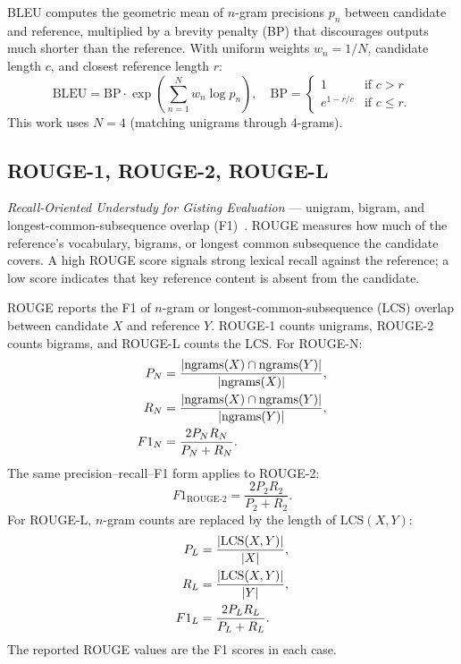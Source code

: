 BLEU computes the geometric mean of $n$-gram precisions $p_n$ between candidate and reference, multiplied by a brevity penalty (BP) that discourages outputs much shorter than the reference. With uniform weights $w_n = 1/N$, candidate length $c$, and closest reference length $r$:
\begin{equation}
\label{eq:bleu}
\mathrm{BLEU} = \mathrm{BP} \cdot \exp\!\left( \sum_{n=1}^{N} w_n \log p_n \right),
\quad
\mathrm{BP} =
\begin{cases}
1 & \text{if } c > r \\
e^{1 - r/c} & \text{if } c \leq r.
\end{cases}
\end{equation}
This work uses $N = 4$ (matching unigrams through 4-grams).

\subsection{ROUGE-1, ROUGE-2, ROUGE-L}

\emph{Recall-Oriented Understudy for Gisting Evaluation} --- unigram, bigram, and longest-common-subsequence overlap (F1)~\cite{Lin2004}. ROUGE measures how much of the reference's vocabulary, bigrams, or longest common subsequence the candidate covers. A high ROUGE score signals strong lexical recall against the reference; a low score indicates that key reference content is absent from the candidate.

ROUGE reports the F1 of $n$-gram or longest-common-subsequence (LCS) overlap between candidate $X$ and reference $Y$. ROUGE-1 counts unigrams, ROUGE-2 counts bigrams, and ROUGE-L counts the LCS. For ROUGE-N:
\begin{align}
P_N &= \frac{|\mathrm{ngrams}(X) \cap \mathrm{ngrams}(Y)|}{|\mathrm{ngrams}(X)|}, \notag \\
R_N &= \frac{|\mathrm{ngrams}(X) \cap \mathrm{ngrams}(Y)|}{|\mathrm{ngrams}(Y)|}, \notag \\
F1_N &= \frac{2 P_N R_N}{P_N + R_N}. \label{eq:rouge1}
\end{align}
The same precision–recall–F1 form applies to ROUGE-2:
\begin{equation}
\label{eq:rouge2}
F1_{\text{ROUGE-2}} = \frac{2 P_2 R_2}{P_2 + R_2}.
\end{equation}
For ROUGE-L, $n$-gram counts are replaced by the length of $\mathrm{LCS}(X, Y)$:
\begin{align}
P_L &= \frac{|\mathrm{LCS}(X, Y)|}{|X|}, \notag \\
R_L &= \frac{|\mathrm{LCS}(X, Y)|}{|Y|}, \notag \\
F1_L &= \frac{2 P_L R_L}{P_L + R_L}. \label{eq:rougeL}
\end{align}
The reported ROUGE values are the F1 scores in each case.

